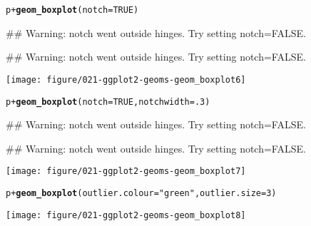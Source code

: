 \documentclass[a4paper,titlepage]{tufte-handout}\usepackage{graphicx, color}
\makeatletter
\def\maxwidth{ %
  \ifdim\Gin@nat@width>\linewidth
    \linewidth
  \else
    \Gin@nat@width
  \fi
}
\newcommand{\hlfunctioncall}[1]{\textcolor[rgb]{0.501960784313725,0,0.329411764705882}{\textbf{#1}}}%
\newcommand{\hlstring}[1]{\textcolor[rgb]{0.6,0.6,1}{#1}}%
\newenvironment{kframe}{%
 \def\at@end@of@kframe{}%
 \ifinner\ifhmode%
  \def\at@end@of@kframe{\end{minipage}}%
  \begin{minipage}{\columnwidth}%
 \fi\fi%
 \def\FrameCommand##1{\hskip\@totalleftmargin \hskip-\fboxsep
 \colorbox{shadecolor}{##1}\hskip-\fboxsep
     \hskip-\linewidth \hskip-\@totalleftmargin \hskip\columnwidth}%
 \MakeFramed {\advance\hsize-\width
   \@totalleftmargin\z@ \linewidth\hsize
   \@setminipage}}%
 {\par\unskip\endMakeFramed%
 \at@end@of@kframe}
\newenvironment{knitrout}{}{} %
\makeatother
\begin{document}
\begin{knitrout}
\begin{kframe}
\begin{alltt}
p + \hlfunctioncall{geom_boxplot}(notch = TRUE)
\end{alltt}


{\ttfamily\noindent\textcolor{warningcolor}{\#\# Warning: notch went outside hinges. Try setting notch=FALSE.}}

{\ttfamily\noindent\textcolor{warningcolor}{\#\# Warning: notch went outside hinges. Try setting notch=FALSE.}}\end{kframe}
\texttt{[image: figure/021-ggplot2-geoms-geom\_boxplot6]} 
\begin{kframe}\begin{alltt}
p + \hlfunctioncall{geom_boxplot}(notch = TRUE, notchwidth = .3)
\end{alltt}


{\ttfamily\noindent\textcolor{warningcolor}{\#\# Warning: notch went outside hinges. Try setting notch=FALSE.}}

{\ttfamily\noindent\textcolor{warningcolor}{\#\# Warning: notch went outside hinges. Try setting notch=FALSE.}}\end{kframe}
\texttt{[image: figure/021-ggplot2-geoms-geom\_boxplot7]} 
\begin{kframe}\begin{alltt}

p + \hlfunctioncall{geom_boxplot}(outlier.colour = \hlstring{"green"}, outlier.size = 3)
\end{alltt}
\end{kframe}
\texttt{[image: figure/021-ggplot2-geoms-geom\_boxplot8]} 
\begin{kframe}\begin{alltt}


\end{alltt}
\end{kframe}
\end{knitrout}
\end{document}

